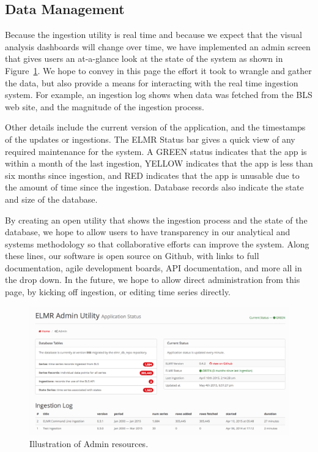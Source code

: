 \documentclass[journal]{IEEEtran}
\begin{document}
{\subsection{Data Management}

Because the ingestion utility is real time and because we expect that the visual analysis dashboards will change over time, we have implemented an admin screen that gives users an at-a-glance look at the state of the system as shown in Figure~\ref{fig:admin}. We hope to convey in this page the effort it took to wrangle and gather the data, but also provide a means for interacting with the real time ingestion system. For example, an ingestion log shows when data was fetched from the BLS web site, and the magnitude of the ingestion process.

Other details include the current version of the application, and the timestamps of the updates or ingestions. The ELMR Status bar gives a quick view of any required maintenance for the system. A GREEN status indicates that the app is within a month of the last ingestion, YELLOW indicates that the app is less than six months since ingestion, and RED indicates that the app is unusable due to the amount of time since the ingestion. Database records also indicate the state and size of the database.

By creating an open utility that shows the ingestion process and the state of the database, we hope to allow users to have transparency in our analytical and systems methodology so that collaborative efforts can improve the system. Along these lines, our software is open source on Github, with links to full documentation, agile development boards, API documentation, and more all in the drop down. In the future, we hope to allow direct administration from this page, by kicking off ingestion, or editing time series directly.}

\begin{figure}[!ht]
    \centering
    \includegraphics[width=1.75\columnwidth]{BensFigures/Admin.png}
    \caption{Illustration of Admin resources.}
    \label{fig:admin}
\end{figure}
\end{document}
